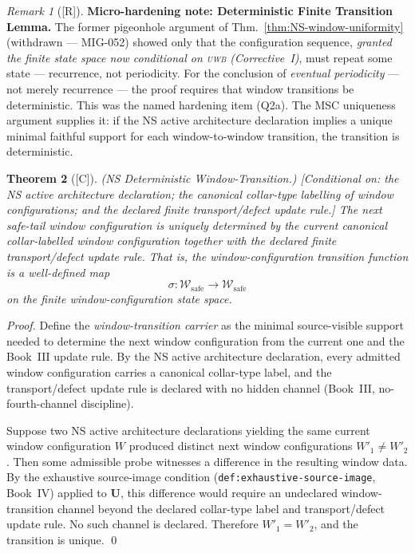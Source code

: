 \documentclass[12pt,oneside]{amsbook}
\theoremstyle{plain}
\newtheorem{theorem}{Theorem}[section]
\theoremstyle{definition}
\theoremstyle{remark}
\newtheorem{remark}[theorem]{Remark}
\newcommand{\status}[1]{\textup{[#1]}}
\begin{document}
\begin{remark}[\status{R}]\label{rem:NS-window-Q2a-hardening}
\textbf{Micro-hardening note: Deterministic Finite Transition Lemma.}
The former pigeonhole argument of
Thm.~\ref{thm:NS-window-uniformity} (withdrawn --- MIG-052) showed
only that the configuration sequence, \emph{granted the finite
state space now conditional on \textsc{uwb} (Corrective~I)}, must
repeat some state --- recurrence, not periodicity. For the conclusion of
\emph{eventual periodicity} --- not merely recurrence --- the proof
requires that window transitions be deterministic. This was the named
hardening item (Q2a). The MSC uniqueness argument supplies it:
if the NS active architecture declaration implies a unique minimal
faithful support for each window-to-window transition, the transition
is deterministic.
\end{remark}

\begin{theorem}[\status{C}]\label{thm:NS-window-determinism}
\textup{(NS Deterministic Window-Transition.)}
\textup{[Conditional on: the NS active architecture declaration;
the canonical collar-type labelling of window configurations;
and the declared finite transport/defect update rule.]}
The next safe-tail window configuration is uniquely determined by the
current canonical collar-labelled window configuration together with
the declared finite transport/defect update rule. That is, the
window-configuration transition function is a well-defined map
\[
 \sigma : \mathcal{W}_{\mathrm{safe}} \to \mathcal{W}_{\mathrm{safe}}
\]
on the finite window-configuration state space.
\end{theorem}

\begin{proof}
Define the \emph{window-transition carrier} as the minimal
source-visible support needed to determine the next window
configuration from the current one and the Book~III update rule.
By the NS active architecture declaration, every admitted window
configuration carries a canonical collar-type label, and the
transport/defect update rule is declared with no hidden channel
(Book~III, no-fourth-channel discipline).

Suppose two NS active architecture declarations yielding the same
current window configuration $W$ produced distinct next window
configurations $W'_1 \neq W'_2$. Then some admissible probe
witnesses a difference in the resulting window data. By the
exhaustive source-image condition (\texttt{def:exhaustive-source-image},
Book~IV) applied to $\mathbf{U}$, this difference would require an
undeclared window-transition channel beyond the declared collar-type
label and transport/defect update rule. No such channel is declared.
Therefore $W'_1 = W'_2$, and the transition is unique.
\qed
\end{proof}
\end{document}
